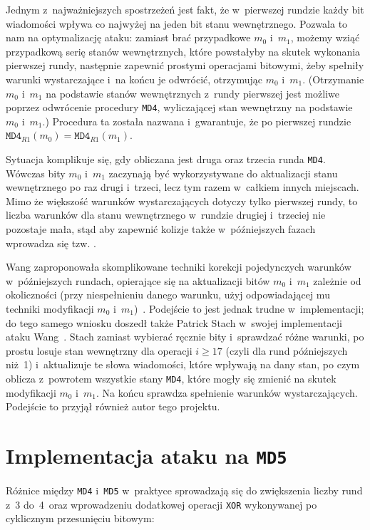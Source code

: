 \documentclass[12pt,a4paper,twoside]{article}
\begin{document}
Jednym z~najważniejszych spostrzeżeń jest fakt, że w~pierwszej rundzie każdy
bit wiadomości wpływa co najwyżej na jeden bit stanu wewnętrznego. Pozwala to
nam na optymalizację ataku: zamiast brać przypadkowe $m_0$ i~$m_1$, możemy
wziąć przypadkową serię stanów wewnętrznych, które powstałyby na skutek
wykonania pierwszej rundy, następnie zapewnić prostymi operacjami bitowymi,
żeby spełniły warunki wystarczające i~na końcu je odwrócić, otrzymując $m_0$
i~$m_1$. (Otrzymanie $m_0$ i~$m_1$ na podstawie stanów wewnętrznych z~rundy
pierwszej jest możliwe poprzez odwrócenie procedury \texttt{MD4}, wyliczającej
stan wewnętrzny na podstawie $m_0$ i~$m_1$.) Procedura ta została nazwana
 i~gwarantuje, że po pierwszej rundzie
$\mathtt{MD4}_{R1}(m_0) = \mathtt{MD4}_{R1}(m_1)$.

Sytuacja komplikuje się, gdy obliczana jest druga oraz trzecia runda
\texttt{MD4}. Wówczas bity $m_0$ i~$m_1$ zaczynają być wykorzystywane do
aktualizacji stanu wewnętrznego po raz drugi i~trzeci, lecz tym razem w~całkiem
innych miejscach. Mimo że większość warunków wystarczających dotyczy tylko
pierwszej rundy, to liczba warunków dla stanu wewnętrznego w~rundzie drugiej
i~trzeciej nie pozostaje mała, stąd aby zapewnić kolizje także w~późniejszych
fazach wprowadza się tzw. .

Wang zaproponowała skomplikowane techniki korekcji pojedynczych warunków
w~późniejszych rundach, opierające się na aktualizacji bitów $m_0$ i~$m_1$
zależnie od okoliczności (przy niespełnieniu danego warunku, użyj
odpowiadającej mu techniki modyfikacji $m_0$ i~$m_1$)~\cite{wang2005md4}.
Podejście to jest jednak trudne w~implementacji; do tego samego wniosku doszedł
także Patrick Stach w~swojej implementacji ataku Wang~\cite{stach2005md4}.
Stach zamiast wybierać ręcznie bity i~sprawdzać różne warunki, po prostu losuje
stan wewnętrzny dla operacji $i \geq 17$ (czyli dla rund późniejszych niż~1)
i~aktualizuje te słowa wiadomości, które wpływają na dany stan, po czym oblicza
z~powrotem wszystkie stany \texttt{MD4}, które mogły się zmienić na skutek
modyfikacji $m_0$ i~$m_1$. Na końcu sprawdza spełnienie warunków
wystarczających. Podejście to przyjął również autor tego projektu.

\section{Implementacja ataku na \texttt{MD5}}

Różnice między \texttt{MD4} i~\texttt{MD5} w~praktyce sprowadzają się do
zwiększenia liczby rund z~3 do~4~oraz wprowadzeniu dodatkowej operacji
\texttt{XOR} wykonywanej po cyklicznym przesunięciu bitowym:
\end{document}
